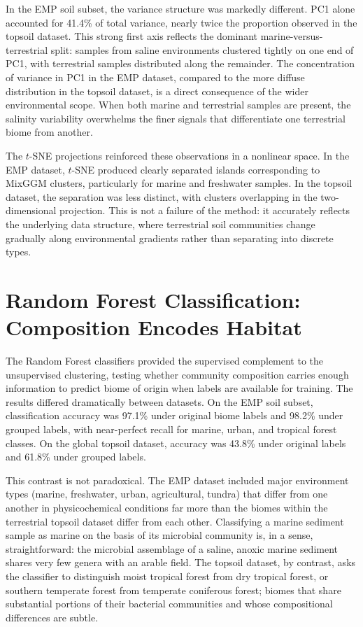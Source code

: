 \documentclass[12pt, oneside]{report}
\begin{document}
In the EMP soil subset, the variance structure was markedly different. PC1 alone accounted
for 41.4\% of total variance, nearly twice the proportion observed in the topsoil dataset.
This strong first axis reflects the dominant marine-versus-terrestrial split: samples from
saline environments clustered tightly on one end of PC1, with terrestrial samples
distributed along the remainder. The concentration of variance in PC1 in the EMP dataset,
compared to the more diffuse distribution in the topsoil dataset, is a direct consequence
of the wider environmental scope. When both marine and terrestrial samples are present,
the salinity variability overwhelms the finer signals that differentiate one terrestrial biome
from another.

The $t$-SNE projections reinforced these observations in a nonlinear space. In the EMP dataset,
$t$-SNE produced clearly separated islands corresponding to MixGGM clusters, particularly
for marine and freshwater samples. In the topsoil dataset, the separation was less distinct,
with clusters overlapping in the two-dimensional projection. This is not a failure of the
method: it accurately reflects the underlying data structure, where terrestrial soil communities change gradually along environmental gradients rather than separating into discrete types.

\section{Random Forest Classification: Composition Encodes Habitat}
\label{disc:rf}

The Random Forest classifiers provided the supervised complement to the unsupervised
clustering, testing whether community composition carries enough information to predict
biome of origin when labels are available for training. The results differed dramatically
between datasets. On the EMP soil subset, classification accuracy was 97.1\% under original
biome labels and 98.2\% under grouped labels, with near-perfect recall for marine, urban,
and tropical forest classes. On the global topsoil dataset, accuracy was 43.8\% under
original labels and 61.8\% under grouped labels.

This contrast is not paradoxical. The EMP dataset included major environment types
(marine, freshwater, urban, agricultural, tundra) that differ from one another in
physicochemical conditions far more than the biomes within the terrestrial topsoil dataset
differ from each other. Classifying a marine sediment sample as marine on the basis of its
microbial community is, in a sense, straightforward: the microbial assemblage of a saline,
anoxic marine sediment shares very few genera with an arable field. The topsoil dataset,
by contrast, asks the classifier to distinguish moist tropical forest from dry tropical
forest, or southern temperate forest from temperate coniferous forest; biomes that share
substantial portions of their bacterial communities and whose compositional differences
are subtle.
\end{document}
